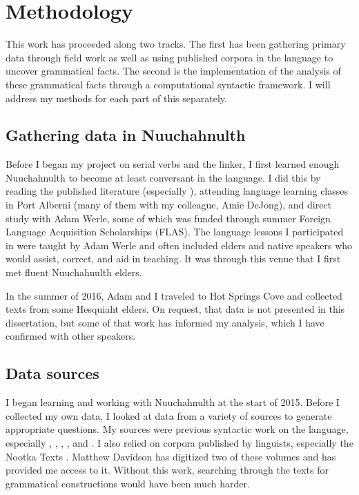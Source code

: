 \chapter{Methodology} \label{ch:methodology}

This work has proceeded along two tracks. The first has been gathering primary data through field work as well as using published corpora in the language to uncover grammatical facts. The second is the implementation of the analysis of these grammatical facts through a computational syntactic framework. I will address my methods for each part of this separately.

\section{Gathering data in Nuuchahnulth} \label{ch:method:ncn}

Before I began my project on serial verbs and the linker, I first learned enough Nuuchahnulth to become at least conversant in the language. I did this by reading the published literature (especially \citealt{sapir1939}), attending language learning classes in Port Alberni (many of them with my colleague, Amie DeJong), and direct study with Adam Werle, some of which was funded through summer Foreign Language Acquisition Scholarships (FLAS). The language lessons I participated in were taught by Adam Werle and often included elders and native speakers who would assist, correct, and aid in teaching. It was through this venue that I first met fluent Nuuchahnulth elders.

In the summer of 2016, Adam and I traveled to Hot Springs Cove and collected texts from some Hesquiaht elders. On request, that data is not presented in this dissertation, but some of that work has informed my analysis, which I have confirmed with other speakers.

\section{Data sources} \label{ch:method:sources}

I began learning and working with Nuuchahnulth at the start of 2015. Before I collected my own data, I looked at data from a variety of sources to generate appropriate questions. My sources were previous syntactic work on the language, especially \cite{jacobsen1993}, \cite{nakayama2001}, \cite{wojdak2003}, \cite{waldie2004}, and \cite{woo2007b}. I also relied on corpora published by linguists, especially the Nootka Texts \citep{sapir1924, sapir1939, sapir1955, whalingindians2000, whalingindians2004, whalingindians2009}. Matthew Davidson has digitized two of these volumes \citep{sapir1939,sapir1955} and has provided me access to it. Without this work, searching through the texts for grammatical constructions would have been much harder.

